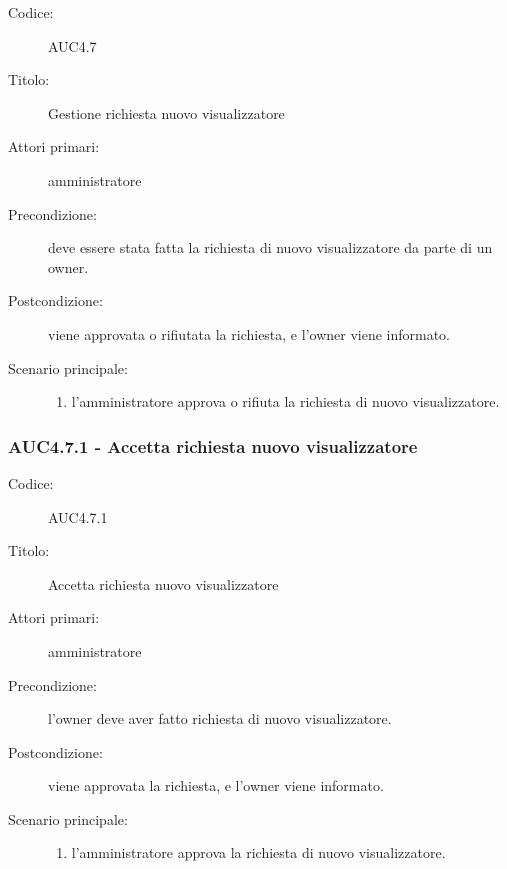 \documentclass[casi-duso]{subfiles}
\begin{document}
\begin{description}
  \item[Codice:] AUC4.7
  \item[Titolo:] Gestione richiesta nuovo visualizzatore
  \item[Attori primari:] amministratore
  \item[Precondizione:] deve essere stata fatta la richiesta di nuovo visualizzatore da parte di un owner.
  \item[Postcondizione:] viene approvata o rifiutata la richiesta, e l'owner viene informato.
  \item[Scenario principale:]
  \begin{enumerate}
    \item l'amministratore approva o rifiuta la richiesta di nuovo visualizzatore.
  \end{enumerate}
\end{description}

\subsubsection{AUC4.7.1 - Accetta richiesta nuovo visualizzatore}%
\label{subsub:AUC4.7.1}
\begin{description}
  \item[Codice:] AUC4.7.1
  \item[Titolo:] Accetta richiesta nuovo visualizzatore
  \item[Attori primari:] amministratore
  \item[Precondizione:] l'owner deve aver fatto richiesta di nuovo visualizzatore.
  \item[Postcondizione:] viene approvata la richiesta, e l'owner viene informato.
  \item[Scenario principale:]
  \begin{enumerate}
    \item l'amministratore approva la richiesta di nuovo visualizzatore.
  \end{enumerate}
\end{description}
\end{document}
